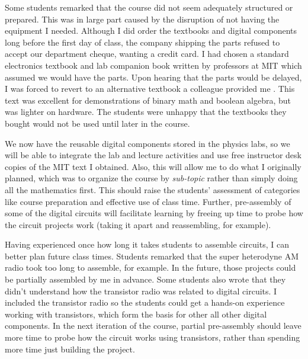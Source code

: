 \documentclass[../../main.tex]{subfiles}
\begin{document}
Some students remarked that the course did not seem adequately structured or prepared.  This was in large part caused by the disruption of not having the equipment I needed.  Although I did order the textbooks and digital components long before the first day of class, the company shipping the parts refused to accept our department cheque, wanting a credit card.  I had chosen a standard electronics textbook and lab companion book written by professors at MIT \cite{theArtOfElectronics} which assumed we would have the parts. Upon hearing that the parts would be delayed, I was forced to revert to an alternative textbook a colleague provided me \cite{digitalFund}. This text was excellent for demonstrations of binary math and boolean algebra, but was lighter on hardware. The students were unhappy that the textbooks they bought would not be used until later in the course. \\ \hspace{0.1cm}

We now have the reusable digital components stored in the physics labs, so we will be able to integrate the lab and lecture activities and use free instructor desk copies of the MIT text I obtained.  Also, this will allow me to do what I originally planned, which was to organize the course by \textit{sub-topic} rather than simply doing all the mathematics first.  This should raise the students' assessment of categories like course preparation and effective use of class time.  Further, pre-assembly of some of the digital circuits will facilitate learning by freeing up time to probe how the circuit projects work (taking it apart and reassembling, for example). \\ \hspace{0.1cm}

Having experienced once how long it takes students to assemble circuits, I can better plan future class times.  Students remarked that the super heterodyne AM radio took too long to assemble, for example.  In the future, those projects could be partially assembled by me in advance.  Some students also wrote that they didn't understand how the transistor radio was related to digital circuits.  I included the transistor radio so the students could get a hands-on experience working with transistors, which form the basis for other all other digital components.  In the next iteration of the course, partial pre-assembly should leave more time to probe how the circuit works using transistors, rather than spending more time just building the project.  \\ \hspace{0.1cm}
\end{document}
